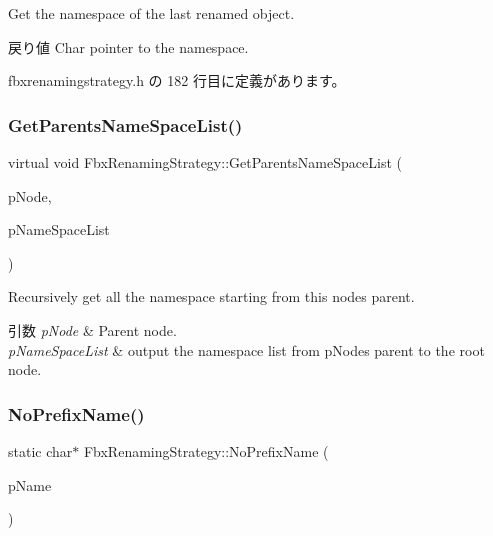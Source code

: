Get the namespace of the last renamed object. \begin{DoxyReturn}{戻り値}
Char pointer to the namespace. 
\end{DoxyReturn}


 fbxrenamingstrategy.\+h の 182 行目に定義があります。

\mbox{\label{class_fbx_renaming_strategy_a4908d6495b3749742c7b23c85f35ad93}} 
\subsubsection{\texorpdfstring{Get\+Parents\+Name\+Space\+List()}{GetParentsNameSpaceList()}}
{\footnotesize\ttfamily virtual void Fbx\+Renaming\+Strategy\+::\+Get\+Parents\+Name\+Space\+List (\begin{DoxyParamCaption}\item[{\hyperlink{class_fbx_node}{Fbx\+Node} $\ast$}]{p\+Node,  }\item[{\hyperlink{class_fbx_array}{Fbx\+Array}$<$ \hyperlink{class_fbx_string}{Fbx\+String} $\ast$$>$ \&}]{p\+Name\+Space\+List }\end{DoxyParamCaption})\hspace{0.3cm}{\ttfamily [virtual]}}

Recursively get all the namespace starting from this node\textquotesingle{}s parent. 
\begin{DoxyParams}{引数}
{\em p\+Node} & Parent node. \\
\hline
{\em p\+Name\+Space\+List} & output the namespace list from p\+Node\textquotesingle{}s parent to the root node. \\
\hline
\end{DoxyParams}
\mbox{\label{class_fbx_renaming_strategy_a74785822c27882421fe5e827c3347786}} 
\subsubsection{\texorpdfstring{No\+Prefix\+Name()}{NoPrefixName()}\hspace{0.1cm}{\footnotesize\ttfamily [1/2]}}
{\footnotesize\ttfamily static char$\ast$ Fbx\+Renaming\+Strategy\+::\+No\+Prefix\+Name (\begin{DoxyParamCaption}\item[{const char $\ast$}]{p\+Name }\end{DoxyParamCaption})\hspace{0.3cm}{\ttfamily [static]}}

